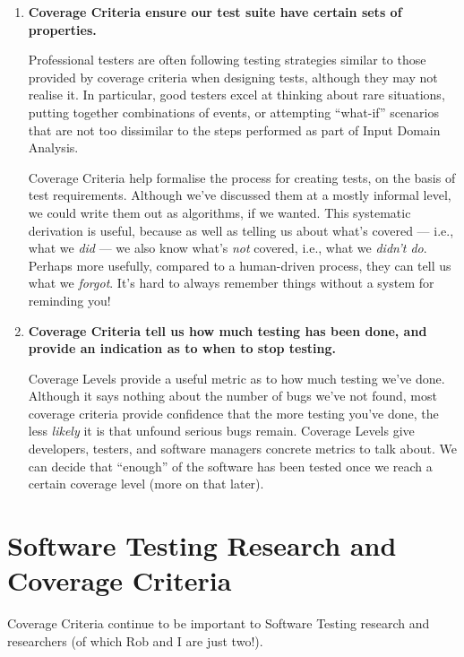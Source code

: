\begin{enumerate}

    \item {\bf Coverage Criteria ensure our test suite have certain sets of 
    properties.}
       
    Professional testers are often following testing strategies similar to those
    provided by coverage criteria when designing tests, although they may not
    realise it. In particular, good testers excel at thinking about rare
    situations, putting together combinations of events, or attempting
    ``what-if'' scenarios that are not too dissimilar to the steps performed as
    part of Input Domain Analysis.
    
    Coverage Criteria help formalise the process for creating tests, on the
    basis of test requirements. Although we've discussed them at a mostly
    informal level, we could write them out as algorithms, if we wanted.
    This systematic derivation is useful, because as well as telling us about
    what's covered --- i.e., what we {\it did} --- we also know what's {\it not}
    covered, i.e., what we {\it didn't do}. Perhaps more usefully, compared to a
    human-driven process, they can tell us what we {\it forgot}. It's hard to
    always remember things without a system for reminding you!

    \item {\bf Coverage Criteria tell us how much testing has been done, 
    and provide an indication as to when to stop testing.}
    
    Coverage Levels provide a useful metric as to how much testing we've done.
    Although it says nothing about the number of bugs we've not found, most
    coverage criteria provide confidence that the more testing you've done, the
    less {\it likely} it is that unfound serious bugs remain. Coverage Levels
    give developers, testers, and software managers concrete metrics to talk
    about. We can decide that ``enough'' of the software has been tested once we
    reach a certain coverage level (more on that later).

\end{enumerate}

\section{Software Testing Research and Coverage Criteria}

Coverage Criteria continue to be important to Software Testing research and
researchers (of which Rob and I are just two!).

